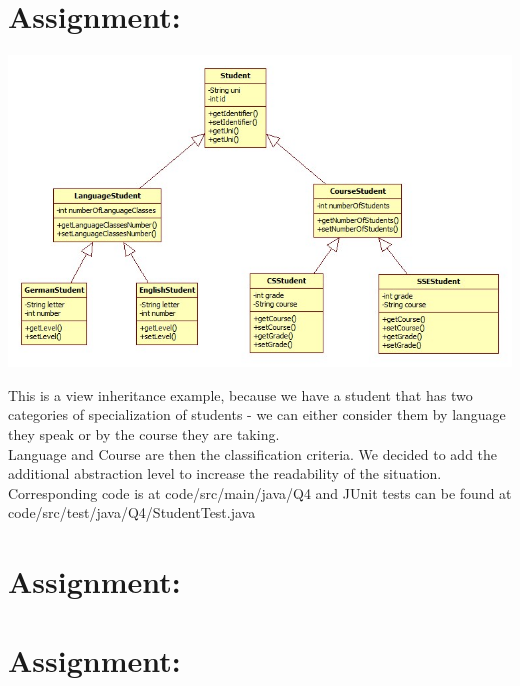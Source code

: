 \documentclass[a4paper,12pt,oneside]{scrreprt}
\begin{document}
	\section{Assignment:}
		\includegraphics[keepaspectratio,width=\textwidth,angle=0]{../uml/ClassDiagram4.jpg}\\
		\begin{flushleft}
			This is a view inheritance example, because we have a student that has two categories of specialization of students - we can either consider them by language they speak or by the course they are taking.\\
			Language and Course are then the classification criteria. We decided to add the additional abstraction level to increase the readability of the situation.\\
			Corresponding code is at code/src/main/java/Q4 and JUnit tests can be found at code/src/test/java/Q4/StudentTest.java
		\end{flushleft}
	\section{Assignment:}
		
	\section{Assignment:}
	\section{}
	
	\section{}
	
\end{document}
